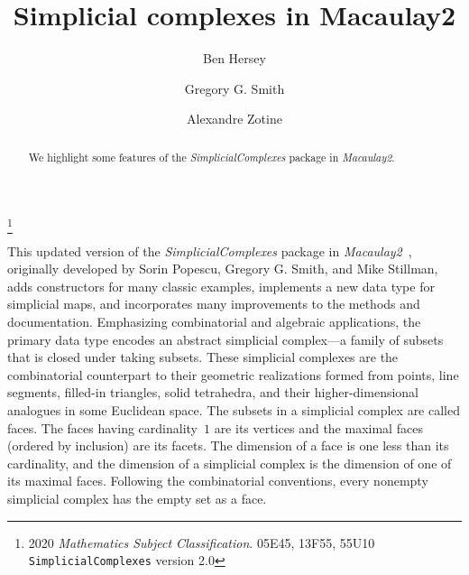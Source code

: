 \documentclass[12pt,leqno]{amsart}
\theoremstyle{definition}
\begin{document}
\vspace*{-4.5em}

\title[Simplicial Complexes]{Simplicial complexes in Macaulay2}

\author[B.~Hersey]{Ben Hersey}
\author[G.G.~Smith]{Gregory G.{} Smith} 
\author[A.~Zotine]{Alexandre Zotine}

\address{Department of Mathematics and Statistics, Queen's
  University, Kingston, Ontario, K7L 3N6
  {\normalfont\texttt{hersey.b@queensu.ca}},
  {\normalfont\texttt{ggsmith@mast.queensu.ca}},
  {\normalfont\texttt{18az45@queensu.ca}}.
}

\thanks{2020 \emph{Mathematics Subject Classification}. 05E45, 13F55,
  55U10\\
  \indent
  \texttt{SimplicialComplexes} version 2.0
}

\begin{abstract}
  We highlight some features of the \emph{SimplicialComplexes} package in
  \emph{Macaulay2}.
\end{abstract}

\maketitle

\vspace{-0.5em}

\noindent
This updated version of the \emph{SimplicialComplexes} package in
\emph{Macaulay2}~\cite{M2}, originally developed by Sorin Popescu, Gregory
G. Smith, and Mike Stillman, adds constructors for many classic examples,
implements a new data type for simplicial maps, and incorporates many
improvements to the methods and documentation.  Emphasizing combinatorial and
algebraic applications, the primary data type encodes an abstract simplicial
complex---a family of subsets that is closed under taking subsets.  These
simplicial complexes are the combinatorial counterpart to their geometric
realizations formed from points, line segments, filled-in triangles, solid
tetrahedra, and their higher-dimensional analogues in some Euclidean space.
The subsets in a simplicial complex are called faces. The faces having
cardinality~$1$ are its vertices and the maximal faces (ordered by inclusion)
are its facets. The dimension of a face is one less than its cardinality, and
the dimension of a simplicial complex is the dimension of one of its maximal
faces. Following the combinatorial conventions, every nonempty simplicial
complex has the empty set as a face.
\end{document}

